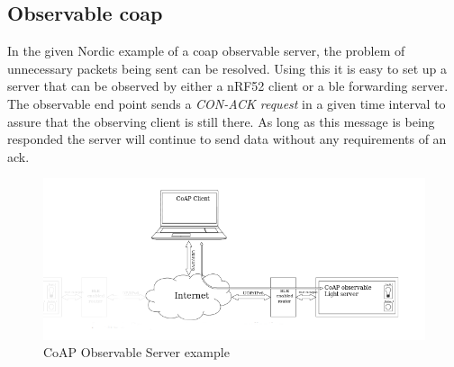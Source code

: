 

\subsection{Observable \gls{coap}}

In the given Nordic example of a \gls{coap} observable server, the problem of unnecessary packets being sent can be resolved. Using this it is easy to set up a server that can be observed by either a nRF52 client or a \gls{ble} forwarding server. The observable end point sends a \textit{CON-ACK request} in a given time interval to assure that the observing client is still there. As long as this message is being responded the server will continue to send data without any requirements of an \gls{ack}. 



\begin{figure}[ht]
    \centering
    \includegraphics[scale=0.47]{CoAPObservableServerExample2.png}    
    \caption{CoAP Observable Server example \cite{nordicNrfDocumentation}}
    \label{fig:CoAPexample3}
\end{figure}






